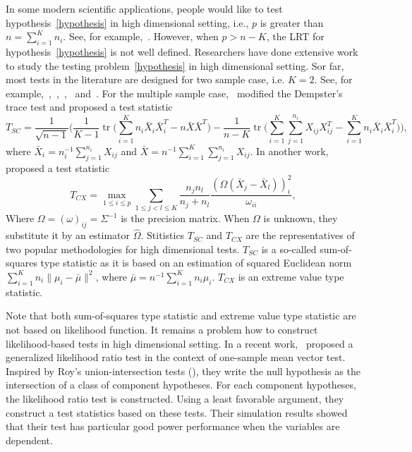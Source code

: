 \documentclass[review]{elsarticle}
\DeclareMathOperator{\mytr}{tr}
\theoremstyle{plain}
\theoremstyle{definition}
\theoremstyle{remark}
\begin{document}
In some modern scientific applications, people would like to test hypothesis~\eqref{hypothesis} in high dimensional setting, i.e., $p$ is greater than $n=\sum_{i=1}^{K}n_i$. See, for example,~\cite{Tsai2009}.
However, when $p>n-K$, the LRT for hypothesis~\eqref{hypothesis} is not well defined.
  Researchers have done extensive work to study the testing problem~\eqref{hypothesis} in high dimensional setting.
 Sor far, most tests in the literature are designed for two sample case, i.e. $K=2$.
  See, for example,~\cite{Bai1996Efiect},~\cite{Chen2010A},~\cite{Srivastava2009A},~\cite{Feng2015Multivariate} and~\cite{Tony2013}.
  For the multiple sample case,~\cite{Schott2007Some} modified the Dempster's trace test and proposed a test statistic
  $$
  T_{SC}=\frac{1}{\sqrt{n-1}}\big(
  \frac{1}{K-1}\mytr\big(\sum_{i=1}^K n_i\bar{X}_i\bar{X}_i^T-n\bar{X}\bar{X}^T\big)-\frac{1}{n-K}\mytr\big(\sum_{i=1}^K \sum_{j=1}^{n_i}X_{ij}X_{ij}^T-\sum_{i=1}^K n_i\bar{X}_i\bar{X}_i^T\big)
  \big),
  $$
  where $\bar{X}_i=n_i^{-1}\sum_{j=1}^{n_i}X_{ij}$ and $\bar{X}=n^{-1}\sum_{i=1}^K\sum_{j=1}^{n_i}X_{ij}$.
  In another work,~\cite{Cai2014High} proposed a test statistic
  $$
  T_{CX}=\max_{1\leq i\leq p} \sum_{1\leq j<l\leq K}\frac{n_j n_l}{n_j+n_l}\frac{(\Omega(\bar{X}_j-\bar{X}_l))_i^2}{\omega_{ii}},
  $$
  Where $\Omega=(\omega)_{ij}=\Sigma^{-1}$ is the precision matrix. When $\Omega$ is unknown, they substitute it by an estimator $\hat{\Omega}$.
  Stitistics $T_{SC}$ and $T_{CX}$ are the representatives of two popular methodologies for high dimensional tests.
  $T_{SC}$ is a so-called sum-of-squares type statistic as it is based on an estimation of squared Euclidean norm $\sum_{i=1}^K n_i\|\mu_i-\bar{\mu}\|^2$, where $\bar{\mu}=n^{-1}\sum_{i=1}^K n_i \mu_i$.
  $T_{CX}$ is an extreme value type statistic.
  
   Note that both sum-of-squares type statistic and extreme value type statistic are not based on likelihood function.
    It remains a problem how to construct likelihood-based tests in high dimensional setting.
    In a recent work,~\cite{Zhao2016A} proposed a generalized likelihood ratio test in the context of one-sample mean vector test.
Inspired by Roy's union-intersection tests (\cite{Roy1953}),
    they write the null hypothesis as the intersection of a class of component hypotheses. For each component hypotheses, the likelihood ratio test is constructed. Using a least favorable argument, they construct a test statistics based on these tests.
    Their simulation results showed that their test has particular good power performance when the variables are dependent.
\end{document}
